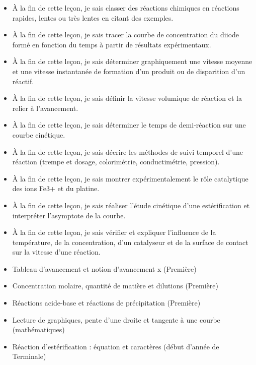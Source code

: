 \documentclass[11pt]{article}
\begin{document}
\begin{objectifs}
\begin{itemize}
\item À la fin de cette leçon, je sais classer des réactions chimiques en réactions rapides, lentes ou très lentes en citant des exemples.
\item À la fin de cette leçon, je sais tracer la courbe de concentration du diiode formé en fonction du temps à partir de résultats expérimentaux.
\item À la fin de cette leçon, je sais déterminer graphiquement une vitesse moyenne et une vitesse instantanée de formation d'un produit ou de disparition d'un réactif.
\item À la fin de cette leçon, je sais définir la vitesse volumique de réaction et la relier à l'avancement.
\item À la fin de cette leçon, je sais déterminer le temps de demi-réaction sur une courbe cinétique.
\item À la fin de cette leçon, je sais décrire les méthodes de suivi temporel d'une réaction (trempe et dosage, colorimétrie, conductimétrie, pression).
\item À la fin de cette leçon, je sais montrer expérimentalement le rôle catalytique des ions Fe3+ et du platine.
\item À la fin de cette leçon, je sais réaliser l'étude cinétique d'une estérification et interpréter l'asymptote de la courbe.
\item À la fin de cette leçon, je sais vérifier et expliquer l'influence de la température, de la concentration, d'un catalyseur et de la surface de contact sur la vitesse d'une réaction.
\end{itemize}
\end{objectifs}

\begin{prerequis}
\begin{itemize}
\item Tableau d'avancement et notion d'avancement x (Première)
\item Concentration molaire, quantité de matière et dilutions (Première)
\item Réactions acide-base et réactions de précipitation (Première)
\item Lecture de graphiques, pente d'une droite et tangente à une courbe (mathématiques)
\item Réaction d'estérification : équation et caractères (début d'année de Terminale)
\end{itemize}
\end{prerequis}
\end{document}
